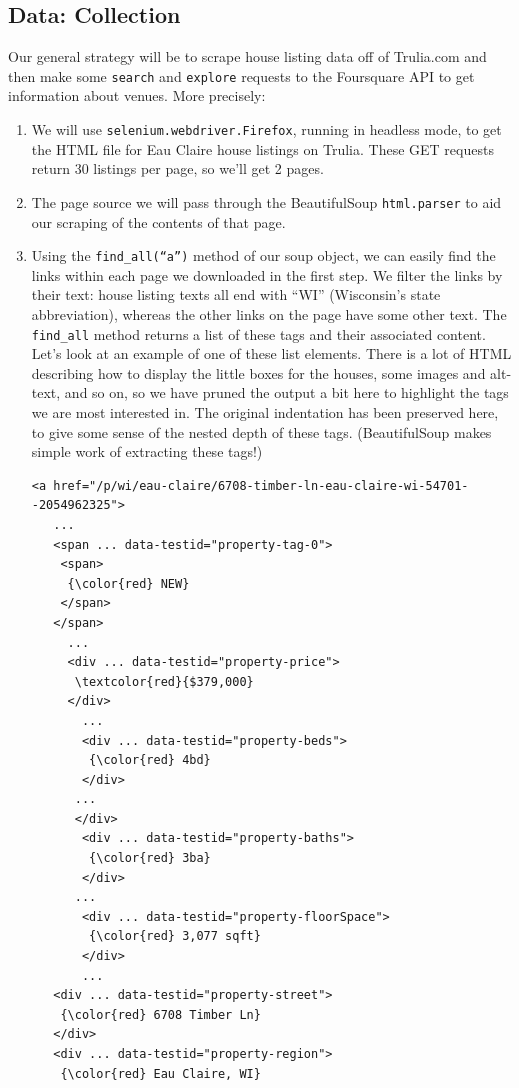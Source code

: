 \documentclass{article}
\begin{document}
\subsection{Data: Collection}
Our general strategy will be to scrape house listing data off of Trulia.com and then make some
{\tt search} and {\tt explore} requests to the Foursquare API to get information about venues. More precisely:
\begin{enumerate}
\item We will use {\tt selenium.webdriver.Firefox}, running in headless mode, to get the HTML file for Eau Claire house listings on Trulia. These GET requests return 30 listings per page, so we'll get 2 pages. 
\item The page source we will pass through the BeautifulSoup {\tt html.parser} to aid our scraping of the contents of that page.
\item Using the {\tt find\_all(``a'')} method of our soup object, we can easily find the links within each page we downloaded in the first step. We filter the links by their text: house listing texts all end with ``WI'' (Wisconsin's state abbreviation), whereas the other links on the page have some other text. The {\tt find\_all} method returns a list of these tags and their associated content. Let's look at an example of one of these list elements. There is a lot of HTML describing how to display the little boxes for the houses, some images and alt-text, and so on, so we have pruned the output a bit here to highlight the tags we are most interested in. The original indentation has been preserved here, to give some sense of the nested depth of these tags. (BeautifulSoup makes simple work of extracting these tags!)
    \begin{Verbatim}[commandchars=\\\{\}]
     <a href="/p/wi/eau-claire/6708-timber-ln-eau-claire-wi-54701--2054962325">
   ...
   <span ... data-testid="property-tag-0">
    <span>
     {\color{red} NEW}
    </span>
   </span>
     ...
     <div ... data-testid="property-price">
      \textcolor{red}{$379,000}
     </div>
       ...
       <div ... data-testid="property-beds">
        {\color{red} 4bd}
       </div>
      ...
      </div>
       <div ... data-testid="property-baths">
        {\color{red} 3ba}
       </div>
      ...
       <div ... data-testid="property-floorSpace">
        {\color{red} 3,077 sqft}
       </div>
       ...
   <div ... data-testid="property-street">
    {\color{red} 6708 Timber Ln}
   </div>
   <div ... data-testid="property-region">
    {\color{red} Eau Claire, WI}

\end{Verbatim}
\end{enumerate}
\end{document}

